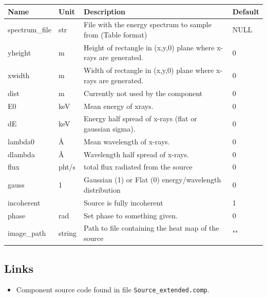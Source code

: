 \begin{longtable}{p{}p{}p{}p{}}
\toprule
\textbf{Name} & \textbf{Unit} & \textbf{Description} & \textbf{Default} \\
\midrule
\endhead
spectrum\_file & str & File with the energy spectrum to sample from (Table format) & NULL \\
yheight & m & Height of rectangle in (x,y,0) plane where x-rays are generated. & 0 \\
xwidth & m & Width of rectangle in (x,y,0) plane where x-rays are generated. & 0 \\
dist & m & Currently not used by the component & 0 \\
E0 & keV & Mean energy of xrays. & 0 \\
dE & keV & Energy half spread of x-rays (flat or gaussian sigma). & 0 \\
lambda0 & \AA{} & Mean wavelength of x-rays. & 0 \\
dlambda & \AA{} & Wavelength half spread of x-rays. & 0 \\
flux & pht/s & total flux radiated from the source & 0 \\
gauss & 1 & Gaussian (1) or Flat (0) energy/wavelength distribution & 0 \\
incoherent &  & Source is fully incoherent & 1 \\
phase & rad & Set phase to something given. & 0 \\
image\_path & string & Path to file containing the heat map of the source & "" \\
\bottomrule
\end{longtable}

\subsection*{Links}
\begin{itemize}
  \item Component source code found in file \texttt{Source\_extended.comp}.
\end{itemize}
